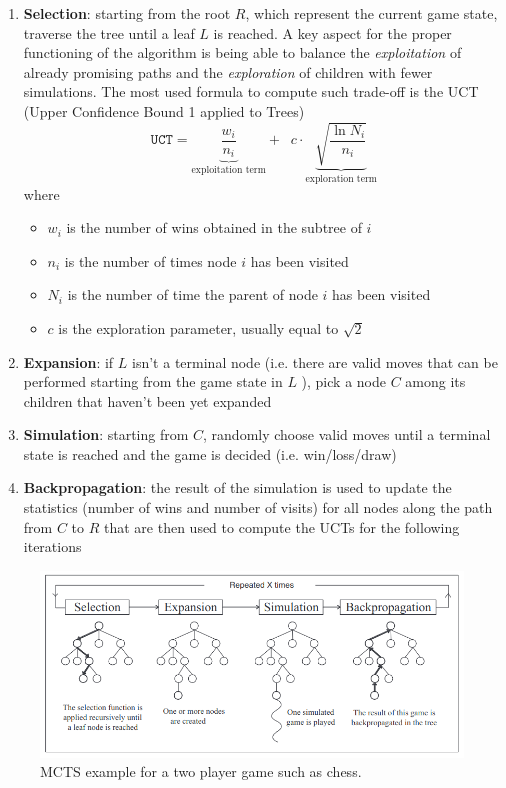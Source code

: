 \begin{enumerate}
    \item \textbf{Selection}: starting from the root $R$, which represent the current game state, traverse the tree until a leaf $L$ is reached. A key aspect for the proper functioning of the algorithm is being able to balance the \textit{exploitation} of already promising paths and the \textit{exploration} of children with fewer simulations. The most used formula to compute such trade-off is the UCT (Upper Confidence Bound 1 applied to Trees)
          \begin{equation}
              \texttt{UCT} = \underbrace{\frac {w_{i}}{n_{i}}}_{\text{exploitation term}}+\;\; c \cdot \underbrace{{\sqrt {\frac {\ln N_{i}}{n_{i}}}}}_{\text{exploration term}}
          \end{equation}
          where
          \begin{itemize}
              \item $w_i$ is the number of wins obtained in the subtree of $i$
              \item $n_i$ is the number of times node $i$ has been visited
              \item $N_i$ is the number of time the parent of node $i$ has been visited
              \item $c$ is the exploration parameter, usually equal to $\sqrt{2}$
          \end{itemize}

    \item \textbf{Expansion}: if $L$ isn't a terminal node (i.e. there are valid moves that can be performed starting from the game state in $L$ ), pick a node $C$ among its children that haven't been yet expanded

    \item \textbf{Simulation}: starting from $C$, randomly choose valid moves until a terminal state is reached and the game is decided (i.e. win/loss/draw)

    \item \textbf{Backpropagation}: the result of the simulation is used to update the statistics (number of wins and number of visits) for all nodes along the path from $C$ to $R$ that are then used to compute the UCTs for the following iterations
\end{enumerate}


\begin{figure}
    \centering
    \includegraphics[width=\linewidth]{figures/mcts.png}
    \caption{MCTS example for a two player game such as chess.}
    \label{fig:mcts}
\end{figure}
